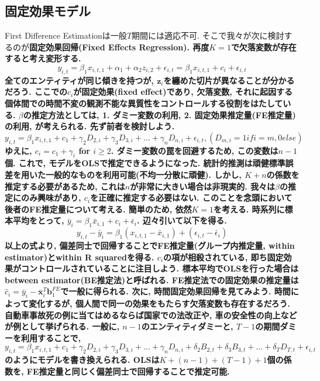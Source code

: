 \documentclass[paper=a4paper,fontsize=10pt]{jlreq}
\begin{document}
\subsection{固定効果モデル}
First Difference Estimationは一般$T$期間には適応不可. そこで我々が次に検討するのが\rmfamily\mcfamily\bfseries{固定効果回帰(Fixed Effects Regression)}\mdseries . 再度$K = 1$で欠落変数が存在すると考え変形する.
\begin{equation*}
  y_{i,t} = \beta_1 {x}_{i,t,1} + \alpha_1 + \alpha_2 z_{i,2} + \epsilon_{i,t} = \beta_1 {x}_{i,t,1} + c_i + \epsilon_{i,t}
\end{equation*} 
全てのエンティティが同じ傾きを持つが, $\mathbf{z}_i$を纏めた切片が異なることが分かるだろう. ここでの$c_i$が固定効果(fixed effect)であり, 欠落変数, それに起因する個体間での時間不変の観測不能な異質性をコントロールする役割をはたしている. $\beta$の推定方法としては, \rmfamily\mcfamily\bfseries{1. ダミー変数の利用}\mdseries , \rmfamily\mcfamily\bfseries{2. 固定効果推定量(FE推定量)の利用}\mdseries , が考えられる. 先ず前者を検討しよう. 
\begin{equation*}
  y_{i,t} = \beta_1 x_{i,t,1} + c_1 + \gamma_2 D_{2,i} + \gamma_3 D_{3,i} + \dots + \gamma_n D_{n,i} + \epsilon_{i,t},　(D_{m,i} = 1　if　i=m,　0　else)
\end{equation*}
ゆえに, $c_i = c_1 + \gamma_i$ for $i \geq 2$. ダミー変数の罠を回避するため, この変数は$n-1$個. これで, モデルをOLSで推定できるようになった. 統計的推測は頑健標準誤差を用いた一般的なものを利用可能(不均一分散に頑健). しかし, $K + n$の係数を推定する必要があるため, これは$n$が非常に大きい場合は非現実的. 我々は$\beta$の推定にのみ興味があり, $c_i$を正確に推定する必要はない. このことを念頭において後者の\rmfamily\mcfamily\bfseries{FE推定量}\mdseries について考える. 簡単のため, 依然$K = 1$を考える. 時系列に標本平均をとって, $\bar{y}_i = \beta_1 \bar{x}_{i,1} + c_i + \bar{\epsilon}_i$. 辺々引いて以下を得る. 
\begin{equation*}
  y_{i,t} - \bar{y}_i = \beta_1 ({x}_{i,t,1} - \bar{x}_{i,1}) + (\epsilon_{i,t} - \bar{\epsilon}_i)
\end{equation*}
以上の式より, 偏差同士で回帰することでFE推定量(グループ内推定量, within estimator)とwithin R squaredを得る. $c_i$の項が相殺されている, 即ち固定効果がコントロールされていることに注目しよう. 標本平均でOLSを行った場合はbetween estimator(BE推定法)と呼ばれる. FE推定法での固定効果の推定量は$\hat{c}_i = \bar{y}_i - \bar{\mathbf{x}}_{i}^T \mathbf{b}_1^{FE}$で一般に得られる. 次に, \rmfamily\mcfamily\bfseries{時間固定効果回帰}\mdseries を見てみよう. 時間によって変化するが, 個人間で同一の効果をもたらす欠落変数も存在するだろう. 自動車事故死の例に当てはめるならば国家での法改正や, 車の安全性の向上などが例として挙げられる. 一般に, $n - 1$のエンティティダミーと, $T - 1$の期間ダミーを利用することで, $y_{i,t} = \beta_1 x_{i,t,1} + c_1 + \gamma_2 D_{2,i} + \gamma_3 D_{3,i} + \dots + \gamma_n D_{n,i} + \delta_2 B_{2,t} + \delta_3 B_{3,t} + \dots + \delta_T D_{T,t}+ \epsilon_{i,t}$のようにモデルを書き換えられる. OLSは$K + (n - 1) + (T - 1) + 1$個の係数を, FE推定量と同じく偏差同士で回帰することで推定可能.\\
\end{document}
